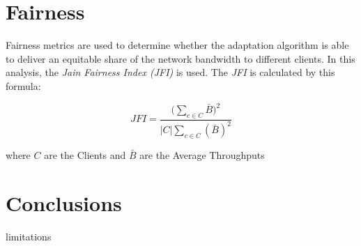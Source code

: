 \section{Fairness}
\label{sec:fairness}

Fairness metrics are used to determine whether the adaptation 
algorithm is able to deliver an equitable share of the network bandwidth 
to different clients. In this analysis, the \textit{Jain Fairness Index (JFI)}
\cite{jfi} is used. The \textit{JFI} is calculated by this formula:

\begin{equation}
    JFI=\frac{\bigg(\sum\limits_{c\in C}\bar{B}\bigg)^2}{\left | C \right |\sum\limits_{c\in C}(\bar{B})^2}
\end{equation}

where  $C$ are the Clients and $\bar{B}$ are the Average Throughputs

\section{Conclusions}
\label{sec:simconclu}

limitations